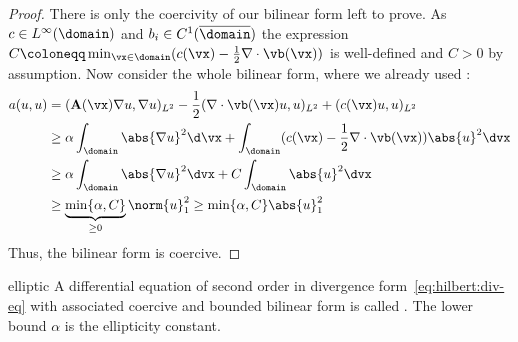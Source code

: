 \begin{proof}
  There is only the coercivity of our bilinear
  form left to prove.
  As $c\in L^\infty(\domain)$ and $b_i\in C^1(\overline{\domain})$ the
  expression $C\coloneqq \min_{\vx\in\domain}(c(\vx)-\frac12 \nabla\cdot \vb(\vx))$ is
  well-defined and $C>0$ by assumption.
  Now consider the whole bilinear form, where we already used
  :
  \begin{align*}
    a(u,u) &= (\mathbf A(\vx)\nabla u,\nabla u)_{L^2} - \frac12 (\nabla \cdot \vb(\vx) u ,u)_{L^2} + (c(\vx)u,u)_{L^2} \\
    &\ge \alpha \int_\domain \abs{\nabla u}^2 \d\vx + \int_\domain (c(\vx)-\frac12 \nabla \cdot \vb(\vx))\abs{u}^2 \dvx \\
    &\ge \alpha \int_\domain \abs{\nabla u}^2 \dvx + C \int_\domain \abs{u}^2 \dvx \\
    &\ge \underbrace{\min\{\alpha,C \}}_{\ge 0}\norm{u}_1^2 \ge \min\{\alpha,C \} \abs{u}_1^2
  \end{align*}
  Thus, the bilinear form is coercive.
\end{proof}

\begin{Definition}{elliptic}
  A differential equation of second order in divergence
  form~\eqref{eq:hilbert:div-eq} with associated coercive
  and bounded bilinear form is called .
  The lower bound $\alpha$ is the ellipticity constant.
\end{Definition}

